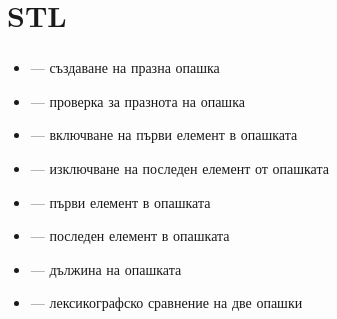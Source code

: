 \documentclass[alsotrans,beameroptions={aspectratio=169}]{beamerswitch}
\begin{document}
\section{STL}

\begin{frame}
  \frametitle{}

  \begin{itemize}
  \item {} --- създаване на празна опашка
  \item {} --- проверка за празнота на опашка
  \item {} --- включване на първи елемент в опашката
  \item {} --- изключване на последен елемент от опашката
  \item {} --- първи елемент в опашката
  \item {} --- последен елемент в опашката
  \item {} --- дължина на опашката
  \item \lst{==,!=,<,>,<=,>=} --- лексикографско сравнение на две опашки
  \end{itemize}
\end{frame}
\end{document}
